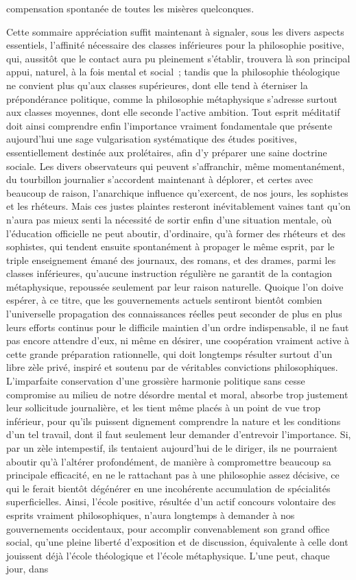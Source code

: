 \documentclass[french,twoside]{book} %
\begin{document}
compensation spontanée de toutes les misères quelconques.\par
Cette sommaire appréciation suffit maintenant à signaler, sous les divers aspects essentiels, l’affinité nécessaire des classes inférieures pour la philosophie positive, qui, aussitôt que le contact aura pu pleinement s’établir, trouvera là son principal appui, naturel, à la fois mental et social ; tandis que la philosophie théologique ne convient plus qu’aux classes supérieures, dont elle tend à éterniser la prépondérance politique, comme la philosophie métaphysique s’adresse surtout aux classes moyennes, dont elle seconde l’active ambition. Tout esprit méditatif doit ainsi comprendre enfin l’importance vraiment fondamentale que présente aujourd’hui une sage vulgarisation systématique des études positives, essentiellement destinée aux prolétaires, afin d’y préparer une saine doctrine sociale. Les divers observateurs qui peuvent s’affranchir, même momentanément, du tourbillon journalier s’accordent maintenant à déplorer, et certes avec beaucoup de raison, l’anarchique influence qu’exercent, de nos jours, les sophistes et les rhéteurs. Mais ces justes plaintes resteront inévitablement vaines tant qu’on n’aura pas mieux senti la nécessité de sortir enfin d’une situation mentale, où l’éducation officielle ne peut aboutir, d’ordinaire, qu’à former des rhéteurs et des sophistes, qui tendent ensuite spontanément à propager le même esprit, par le triple enseignement émané des journaux, des romans, et des drames, parmi les classes inférieures, qu’aucune instruction régulière ne garantit de la contagion métaphysique, repoussée seulement par leur raison naturelle. Quoique l’on doive espérer, à ce titre, que les gouvernements actuels sentiront bientôt combien l’universelle propagation des connaissances réelles peut seconder de plus en plus leurs efforts continus pour le difficile maintien d’un ordre indispensable, il ne faut pas encore attendre d’eux, ni même en désirer, une coopération vraiment active à cette grande préparation rationnelle, qui doit longtemps résulter surtout d’un libre zèle privé, inspiré et soutenu par de véritables convictions philosophiques. L’imparfaite conservation d’une grossière harmonie politique sans cesse compromise au milieu de notre désordre mental et moral, absorbe trop justement leur sollicitude journalière, et les tient même placés à un point de vue trop inférieur, pour qu’ils puissent dignement comprendre la nature et les conditions d’un tel travail, dont il faut seulement leur demander d’entrevoir l’importance. Si, par un zèle intempestif, ils tentaient aujourd’hui de le diriger, ils ne pourraient aboutir qu’à l’altérer profondément, de manière à compromettre beaucoup sa principale efficacité, en ne le rattachant pas à une philosophie assez décisive, ce qui le ferait bientôt dégénérer en une incohérente accumulation de spécialités superficielles. Ainsi, l’école positive, résultée d’un actif concours volontaire des esprits vraiment philosophiques, n’aura longtemps à demander à nos gouvernements occidentaux, pour accomplir convenablement son grand office social, qu’une pleine liberté d’exposition et de discussion, équivalente à celle dont jouissent déjà l’école théologique et l’école métaphysique. L’une peut, chaque jour, dans 
\end{document}
